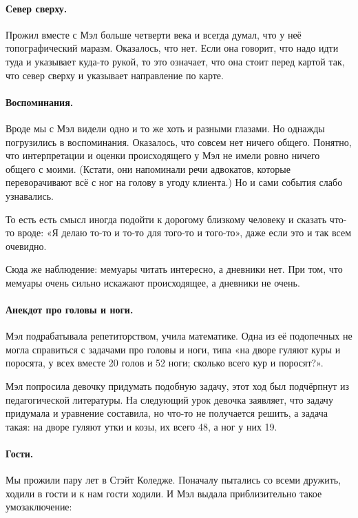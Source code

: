 \documentclass{book}
\begin{document}
\paragraph{Север сверху.}
Прожил вместе с Мэл больше четверти века и всегда думал, что у неё топографический маразм.
Оказалось, что нет.
Если она говорит, что надо идти туда и указывает куда-то рукой, то это означает, что она стоит перед картой так, что север сверху и указывает направление по карте.

\paragraph{Воспоминания.}
Вроде мы с Мэл видели одно и то же хоть и разными глазами.
Но однажды погрузились в воспоминания.
Оказалось, что совсем нет ничего общего.
Понятно, что интерпретации и оценки происходящего у Мэл не имели ровно ничего общего с моими.
(Кстати, они напоминали речи адвокатов, которые переворачивают всё с ног на голову в угоду клиента.)
Но и сами события слабо узнавались.

То есть есть смысл иногда подойти к дорогому близкому человеку и сказать что-то вроде: «Я делаю то-то и то-то для того-то и того-то», даже если это и так всем очевидно.

Сюда же наблюдение: мемуары читать интересно, а дневники нет.
При том, что мемуары очень сильно искажают происходящее, а дневники не очень.

\paragraph{Анекдот про головы и ноги.}
Мэл подрабатывала репетиторством, учила математике.
Одна из её подопечных не могла справиться с задачами про головы и ноги,
типа «на дворе гуляют куры и поросята, у всех вместе 20 голов и 52 ноги;
сколько всего кур и поросят?».

Мэл попросила девочку придумать подобную задачу,
этот ход был подчёрпнут из педагогической литературы.
На следующий урок девочка заявляет, что задачу придумала и уравнение составила, но что-то не получается решить,
а задача такая: на дворе гуляют утки и козы, их всего 48, а ног у них 19.

\paragraph{Гости.}
Мы прожили пару лет в Стэйт Коледже.
Поначалу пытались со всеми дружить, ходили в гости и к нам гости ходили.
И Мэл выдала приблизительно такое умозаключение:
\end{document}
